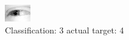 \begin{figure}[h!]
\begin{center}
\includegraphics[width=0.60\columnwidth]{figures/ID2518_class_3_target_4.png}
\end{center}
\caption{ Classification: 3 actual target: 4}
\label{fig:ID2518_class_3_target_4}
\end{figure}
